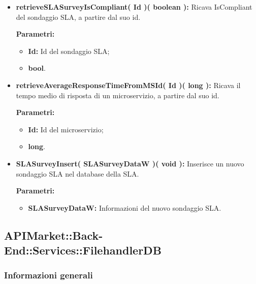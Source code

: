 \begin{itemize}
\begin{itemize}
			\item \textbf{retrieveSLASurveyIsCompliant( Id )( boolean ):} Ricava IsCompliant del sondaggio SLA, a partire dal suo id.
				\begin{description}
    				\item[\textbf{Parametri:}]
				\end{description}
				\begin{itemize}
					\item \textbf{Id:} Id del sondaggio SLA;
					\item \textbf{bool}.
				\end{itemize}
				
			\item \textbf{retrieveAverageResponseTimeFromMSId( Id )( long ):} Ricava il tempo medio di risposta di un microservizio, a partire dal suo id.
				\begin{description}
					\item[\textbf{Parametri:}]
				\end{description}
				\begin{itemize}
					\item \textbf{Id:} Id del microservizio;
					\item \textbf{long}.
				\end{itemize}
			
			
			\item \textbf{SLASurveyInsert( SLASurveyDataW )( void ):} Inserisce un nuovo sondaggio SLA nel database della SLA.
				\begin{description}
    				\item[\textbf{Parametri:}]
				\end{description}
				\begin{itemize}
					\item \textbf{SLASurveyDataW:} Informazioni del nuovo sondaggio SLA.
				\end{itemize}
				
		\end{itemize}
\end{itemize}

\subsection{APIMarket::Back-End::Services::FilehandlerDB}

\subsubsection{Informazioni generali}

